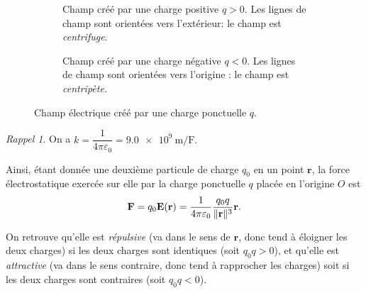 \documentclass{article}
\renewcommand{\vec}[1]{\boldsymbol{\mathbf{#1}}}
\renewcommand\epsilon\varepsilon
\DeclarePairedDelimiter{\norm}{\lVert}{\rVert}
\theoremstyle{definition}
\theoremstyle{remark}
\newtheorem*{rap}{Rappel}
\begin{document}
\begin{figure}[h]
	\centering
	\begin{subfigure}[b]{0.4\textwidth}
		\caption{Champ créé par une charge positive $q>0$. Les lignes de champ sont orientées vers l'extérieur: le champ est \textit{centrifuge}.}
	\end{subfigure}\qquad
	\begin{subfigure}[b]{0.4\textwidth}
		\caption{Champ créé par une charge négative $q<0$. Les lignes de champ sont orientées vers l'origine : le champ est \textit{centripète.}}
	\end{subfigure}
    \caption{Champ électrique créé par une charge ponctuelle $q$.}
\end{figure}

\begin{rap}
	On a $k=\dfrac{1}{4\pi\epsilon_0}=\SI{9.0e9}{\meter\per\farad}.$
\end{rap}

Ainsi, étant donnée une deuxième particule de charge $q_0$ en un point $\vec{r}$, la force électrostatique exercée sur elle par la charge ponctuelle $q$ placée en l'origine $O$ est
	\[ 
	\vec{F} = q_0\vec{E}(\vec{r}) = \frac{1}{4\pi\epsilon_0}\frac{q_0q}{\norm{\vec{r}}^3}\vec{r}.
	 \]

On retrouve qu'elle est \textit{répulsive} (va dans le sens de $\vec{r}$, donc tend à éloigner les deux charges)  si les deux charges sont identiques (soit $q_0q>0$), et qu'elle est \textit{attractive} (va dans le sens contraire, donc tend à rapprocher les charges) soit si les deux charges sont contraires (soit $q_0q<0$).
\end{document}
